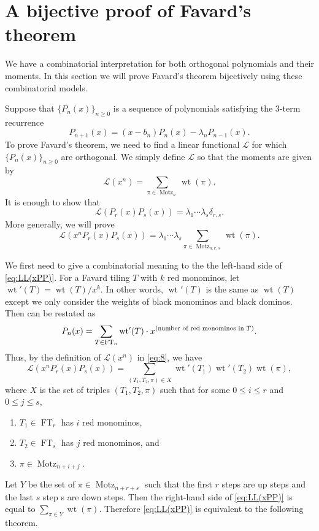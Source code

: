 \documentclass[oneside]{book}
\numberwithin{equation}{section}
\theoremstyle{definition}
\newcommand\Motz{\operatorname{Motz}}
\newcommand\LL{\mathcal{L}}
\newcommand\FT{\operatorname{FT}}
\newcommand\wt{\operatorname{wt}}
\begin{document}
\section{A bijective proof of Favard's theorem}

We have a combinatorial interpretation for both orthogonal polynomials
and their moments. In this section we will prove Favard's theorem
bijectively using these combinatorial models.


Suppose that \( \{ P_n(x) \}_{n\ge 0} \) is a sequence of polynomials
satisfying the 3-term recurrence
\[
  P_{n+1}(x) = (x-b_n) P_n(x) - \lambda_n P_{n-1}(x).
\]
To prove Favard's theorem, we need to find a linear functional
\( \LL \) for which \( \{ P_n(x) \}_{n\ge 0} \) are orthogonal.
We simply define \( \LL \) so that the moments are given by
\begin{equation}\label{eq:8}
  \LL(x^n) = \sum_{\pi\in \Motz_{n}} \wt(\pi).
\end{equation}
It is enough to show that
\[
  \LL(P_r(x)P_s(x)) = \lambda_1 \cdots \lambda_s \delta_{r,s}.
\]
More generally, we will prove
\begin{equation}\label{eq:LL(xPP)}
  \LL(x^n P_r(x)P_s(x)) = \lambda_1 \cdots \lambda_s \sum_{\pi\in
    \Motz_{n,r,s}} \wt(\pi).
\end{equation}

We first need to give a combinatorial meaning to the the left-hand
side of \eqref{eq:LL(xPP)}. For a Favard tiling \( T \) with \( k \)
red monominos, let \( \wt'(T) = \wt(T)/x^k \). In other words,
\( \wt'(T) \) is the same as \( \wt(T) \) except we only consider the
weights of black monominos and black dominos.
Then  can be restated as
\[
  P_n(x) = \sum_{T\in \FT_n} \wt'(T) \cdot x^{(\text{number of red monominos in \( T \)})}.
\]
Thus, by the definition of \( \LL(x^n) \) in \eqref{eq:8}, we have
\[
    \LL(x^n P_r(x)P_s(x)) = 
    \sum_{(T_1,T_2,\pi)\in X} \wt'(T_1) \wt'(T_2) \wt(\pi),
\]
where \( X \) is the set of triples \( (T_1,T_2,\pi) \)
such that for some \( 0\le i\le r \) and \( 0\le j\le s \),
\begin{enumerate}
\item \( T_1\in \FT_r \) has \( i \) red monominos,
\item \( T_2\in \FT_s \) has \( j \) red monominos, and
\item \( \pi\in \Motz_{n+i+j} \).
\end{enumerate}

Let \( Y \) be the set of \( \pi\in \Motz_{n+r+s} \) such that the
first \( r \) steps are up steps and the last \( s \) step s are down
steps. Then the right-hand side of \eqref{eq:LL(xPP)} is equal to
\( \sum_{\pi\in Y} \wt(\pi) \). Therefore \eqref{eq:LL(xPP)} is
equivalent to the following theorem.
\end{document}
